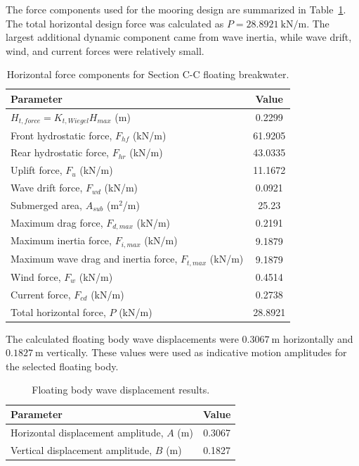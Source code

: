 \documentclass[a4paper, 11pt]{article}
\begin{document}
The force components used for the mooring design are summarized in Table~\ref{tab:floating_forces}. The total horizontal design force was calculated as \(P=28.8921~\mathrm{kN/m}\). The largest additional dynamic component came from wave inertia, while wave drift, wind, and current forces were relatively small.

\begin{table}[H]
\centering
\caption{Horizontal force components for Section C-C floating breakwater.}
\label{tab:floating_forces}
\begin{tabular}{l c}
\hline
Parameter & Value \\
\hline
\(H_{t,force}=K_{t,Wiegel}H_{max}\) (m) & 0.2299 \\
Front hydrostatic force, \(F_{hf}\) (kN/m) & 61.9205 \\
Rear hydrostatic force, \(F_{hr}\) (kN/m) & 43.0335 \\
Uplift force, \(F_u\) (kN/m) & 11.1672 \\
Wave drift force, \(F_{wd}\) (kN/m) & 0.0921 \\
Submerged area, \(A_{sub}\) (m\(^2\)/m) & 25.23 \\
Maximum drag force, \(F_{d,max}\) (kN/m) & 0.2191 \\
Maximum inertia force, \(F_{i,max}\) (kN/m) & 9.1879 \\
Maximum wave drag and inertia force, \(F_{t,max}\) (kN/m) & 9.1879 \\
Wind force, \(F_w\) (kN/m) & 0.4514 \\
Current force, \(F_{cd}\) (kN/m) & 0.2738 \\
Total horizontal force, \(P\) (kN/m) & 28.8921 \\
\hline
\end{tabular}
\end{table}

The calculated floating body wave displacements were \(0.3067~\mathrm{m}\) horizontally and \(0.1827~\mathrm{m}\) vertically. These values were used as indicative motion amplitudes for the selected floating body.

\begin{table}[H]
\centering
\caption{Floating body wave displacement results.}
\label{tab:floating_displacements}
\begin{tabular}{l c}
\hline
Parameter & Value \\
\hline
Horizontal displacement amplitude, \(A\) (m) & 0.3067 \\
Vertical displacement amplitude, \(B\) (m) & 0.1827 \\
\hline
\end{tabular}
\end{table}
\end{document}
